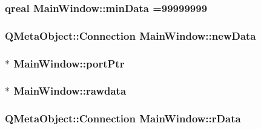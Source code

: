 \hypertarget{class_main_window_a02535ba8418420aee9068241aa3e744c}{
\subsubsection[{min\-Data}]{\setlength{\rightskip}{0pt plus 5cm}qreal Main\-Window\-::min\-Data =99999999\hspace{0.3cm}{\ttfamily [private]}}}\label{class_main_window_a02535ba8418420aee9068241aa3e744c}
\hypertarget{class_main_window_acff37cb14f3ab80806cc993856632401}{
\subsubsection[{new\-Data}]{\setlength{\rightskip}{0pt plus 5cm}Q\-Meta\-Object\-::\-Connection Main\-Window\-::new\-Data\hspace{0.3cm}{\ttfamily [private]}}}\label{class_main_window_acff37cb14f3ab80806cc993856632401}
\hypertarget{class_main_window_ae00babad562899a2cd108ff3ee684990}{
\subsubsection[{port\-Ptr}]{$\ast$ Main\-Window\-::port\-Ptr\hspace{0.3cm}{\ttfamily [private]}}}\label{class_main_window_ae00babad562899a2cd108ff3ee684990}
\hypertarget{class_main_window_a478554a221305a416f331e9df2569749}{
\subsubsection[{rawdata}]{$\ast$ Main\-Window\-::rawdata\hspace{0.3cm}{\ttfamily [private]}}}\label{class_main_window_a478554a221305a416f331e9df2569749}
\hypertarget{class_main_window_aa252eef60aa6c3f81a20533a0fe73a2e}{
\subsubsection[{r\-Data}]{\setlength{\rightskip}{0pt plus 5cm}Q\-Meta\-Object\-::\-Connection Main\-Window\-::r\-Data\hspace{0.3cm}{\ttfamily [private]}}}\label{class_main_window_aa252eef60aa6c3f81a20533a0fe73a2e}
